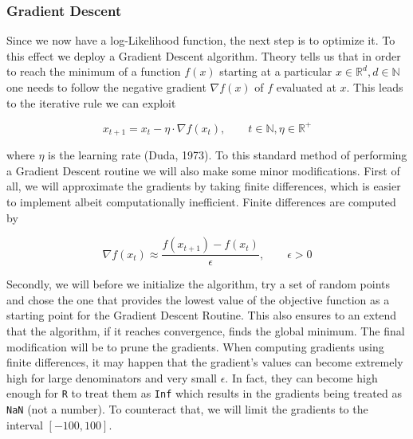 \documentclass{article}
\begin{document}
\subsubsection{Gradient Descent}

Since we now have a log-Likelihood function, the next step is to optimize it. To this effect we deploy a Gradient Descent algorithm. Theory tells us that in order to reach the minimum of a function $f(x)$ starting at a particular $x \in \mathbb{R}^d, d \in \mathbb{N}$ one needs to follow the negative gradient $\nabla f(x)$ of $f$ evaluated at $x$. This leads to the iterative rule we can exploit

\begin{equation}
\label{gradientDescent}
x_{t+1} = x_t - \eta \cdot \nabla f(x_t), \qquad t \in \mathbb{N}, \eta \in \mathbb{R}^+
\end{equation}

where $\eta$ is the learning rate (Duda, 1973). To this standard method of performing a Gradient Descent routine we will also make some minor modifications. First of all, we will approximate the gradients by taking finite differences, which is easier to implement albeit computationally inefficient. Finite differences are computed by

\begin{equation}
\label{finDiff}
\nabla f(x_t) \approx \frac{f(x_{t+1}) - f(x_t)}{\epsilon}, \qquad \epsilon > 0
\end{equation}

Secondly, we will before we initialize the algorithm, try a set of random points and chose the one that provides the lowest value of the objective function as a starting point for the Gradient Descent Routine. This also ensures to an extend that the algorithm, if it reaches convergence, finds the global minimum. The final modification will be to prune the gradients. When computing gradients using finite differences, it may happen that the gradient's values can become extremely high for large denominators and very small $\epsilon$. In fact, they can become high enough for \texttt{R} to treat them as \texttt{Inf} which results in the gradients being treated as \texttt{NaN} (not a number). To counteract that, we will limit the gradients to the interval $[-100, 100]$. 
\end{document}
